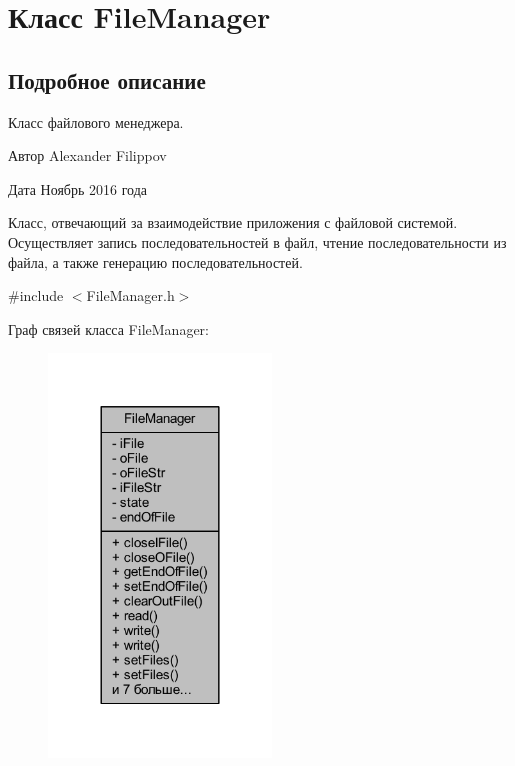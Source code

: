 \hypertarget{class_file_manager}{}\section{Класс File\+Manager}
\label{class_file_manager}


\subsection{Подробное описание}
Класс файлового менеджера. 

\begin{DoxyAuthor}{Автор}
Alexander Filippov 
\end{DoxyAuthor}
\begin{DoxyDate}{Дата}
Ноябрь 2016 года
\end{DoxyDate}
Класс, отвечающий за взаимодействие приложения с файловой системой. Осуществляет запись последовательностей в файл, чтение последовательности из файла, а также генерацию последовательностей. 

{\ttfamily \#include $<$File\+Manager.\+h$>$}



Граф связей класса File\+Manager\+:\nopagebreak
\begin{figure}[H]
\begin{center}
\leavevmode
\includegraphics[width=168pt]{class_file_manager__coll__graph}
\end{center}
\end{figure}

